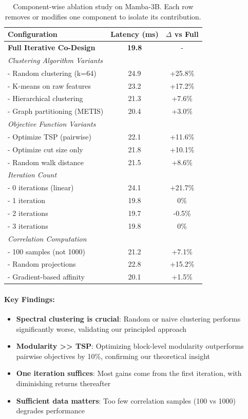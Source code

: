 \documentclass{article}
\begin{document}
\begin{table}[h]
\caption{Component-wise ablation study on Mamba-3B. Each row removes or 
modifies one component to isolate its contribution.}
\label{tab:ablations}
\centering
\begin{tabular}{lcc}
\toprule
\textbf{Configuration} & \textbf{Latency (ms)} & \textbf{$\Delta$ vs Full} \\
\midrule
\textbf{Full Iterative Co-Design} & \textbf{19.8} & - \\
\midrule
\multicolumn{3}{l}{\textit{Clustering Algorithm Variants}} \\
- Random clustering (k=64) & 24.9 & +25.8\% \\
- K-means on raw features & 23.2 & +17.2\% \\
- Hierarchical clustering & 21.3 & +7.6\% \\
- Graph partitioning (METIS) & 20.4 & +3.0\% \\
\midrule
\multicolumn{3}{l}{\textit{Objective Function Variants}} \\
- Optimize TSP (pairwise) & 22.1 & +11.6\% \\
- Optimize cut size only & 21.8 & +10.1\% \\
- Random walk distance & 21.5 & +8.6\% \\
\midrule
\multicolumn{3}{l}{\textit{Iteration Count}} \\
- 0 iterations (linear) & 24.1 & +21.7\% \\
- 1 iteration & 19.8 & 0\% \\
- 2 iterations & 19.7 & -0.5\% \\
- 3 iterations & 19.8 & 0\% \\
\midrule
\multicolumn{3}{l}{\textit{Correlation Computation}} \\
- 100 samples (not 1000) & 21.2 & +7.1\% \\
- Random projections & 22.8 & +15.2\% \\
- Gradient-based affinity & 20.1 & +1.5\% \\
\bottomrule
\end{tabular}
\end{table}

\paragraph{Key Findings:}
\begin{itemize}
    \item \textbf{Spectral clustering is crucial}: Random or naive clustering 
    performs significantly worse, validating our principled approach
    \item \textbf{Modularity >> TSP}: Optimizing block-level modularity 
    outperforms pairwise objectives by 10\%, confirming our theoretical insight
    \item \textbf{One iteration suffices}: Most gains come from the first 
    iteration, with diminishing returns thereafter
    \item \textbf{Sufficient data matters}: Too few correlation samples 
    (100 vs 1000) degrades performance
\end{itemize}
\end{document}
